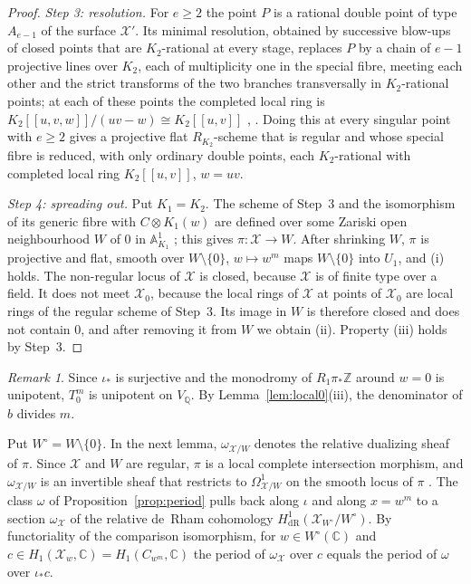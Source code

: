 \documentclass[11pt]{amsart}
\theoremstyle{definition}
\theoremstyle{remark}
\newtheorem{remark}[theorem]{Remark}
\numberwithin{equation}{section}
\newcommand{\Q}{\mathbb{Q}}
\newcommand{\Z}{\mathbb{Z}}
\newcommand{\C}{\mathbb{C}}
\newcommand{\A}{\mathbb{A}}
\newcommand{\cX}{\mathcal{X}}
\begin{document}
\begin{proof}
\emph{Step 3: resolution.} For $e\ge2$ the point $P$ is a rational double point of type $A_{e-1}$ of the surface $\cX'$. Its minimal resolution, obtained by successive blow-ups of closed points that are $K_2$-rational at every stage, replaces $P$ by a chain of $e-1$ projective lines over $K_2$, each of multiplicity one in the special fibre, meeting each other and the strict transforms of the two branches transversally in $K_2$-rational points; at each of these points the completed local ring is $K_2[[u,v,w]]/(uv-w)\cong K_2[[u,v]]$ \citep[\S1]{DeligneMumford1969}, \citep[\S10.3]{Liu2002}. Doing this at every singular point with $e\ge2$ gives a projective flat $R_{K_2}$-scheme that is regular and whose special fibre is reduced, with only ordinary double points, each $K_2$-rational with completed local ring $K_2[[u,v]]$, $w=uv$.

\emph{Step 4: spreading out.} Put $K_1=K_2$. The scheme of Step~3 and the isomorphism of its generic fibre with $C\otimes K_1(w)$ are defined over some Zariski open neighbourhood $W$ of $0$ in $\A^1_{K_1}$ \citep[\S8]{EGAIV3}; this gives $\pi:\cX\to W$. After shrinking $W$, $\pi$ is projective and flat, smooth over $W\setminus\{0\}$, $w\mapsto w^m$ maps $W\setminus\{0\}$ into $U_1$, and (i) holds. The non-regular locus of $\cX$ is closed, because $\cX$ is of finite type over a field. It does not meet $\cX_0$, because the local rings of $\cX$ at points of $\cX_0$ are local rings of the regular scheme of Step~3. Its image in $W$ is therefore closed and does not contain $0$, and after removing it from $W$ we obtain (ii). Property (iii) holds by Step~3.
\end{proof}

\begin{remark}\label{rem:m}
Since $\iota_*$ is surjective and the monodromy of $R_1\pi_*\Z$ around $w=0$ is unipotent, $T_0^m$ is unipotent on $V_\Q$. By Lemma~\ref{lem:local0}(iii), the denominator of $b$ divides $m$.
\end{remark}

Put $W^\circ=W\setminus\{0\}$. In the next lemma, $\omega_{\cX/W}$ denotes the relative dualizing sheaf of $\pi$. Since $\cX$ and $W$ are regular, $\pi$ is a local complete intersection morphism, and $\omega_{\cX/W}$ is an invertible sheaf that restricts to $\Omega^1_{\cX/W}$ on the smooth locus of $\pi$ \citep[\S6.4]{Liu2002}. The class $\omega$ of Proposition~\ref{prop:period} pulls back along $\iota$ and along $x=w^m$ to a section $\omega_\cX$ of the relative de~Rham cohomology $H^1_{\mathrm{dR}}(\cX_{W^\circ}/W^\circ)$. By functoriality of the comparison isomorphism, for $w\in W^\circ(\C)$ and $c\in H_1(\cX_w,\C)=H_1(C_{w^m},\C)$ the period of $\omega_\cX$ over $c$ equals the period of $\omega$ over $\iota_*c$.
\end{document}
